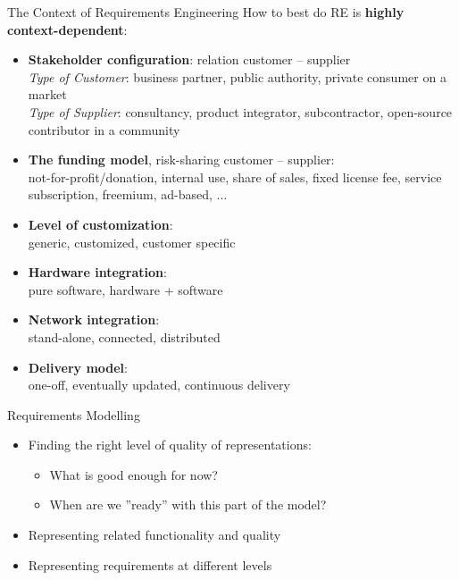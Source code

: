 \documentclass{beamer}
\begin{document}
\begin{frame}[fragile]{The Context of Requirements Engineering}
How to best do RE is \textbf{highly context-dependent}:
\begin{itemize} 
\item \textbf{Stakeholder configuration}: relation customer -- supplier
\\\textit{Type of Customer}: business partner, public authority, private consumer on a market
\\\textit{Type of Supplier}: consultancy, product integrator, subcontractor, open-source contributor in a community
\item \textbf{The funding model}, risk-sharing customer -- supplier:
\\not-for-profit/donation, internal use, share of sales, fixed license fee, service subscription, freemium, ad-based, ... 
\item \textbf{Level of customization}:
\\generic, customized, customer specific
\item \textbf{Hardware integration}:
\\pure software, hardware + software
\item \textbf{Network integration}:
\\stand-alone, connected, distributed
\item \textbf{Delivery model}:
\\one-off, eventually updated, continuous delivery
\end{itemize}
\end{frame}

\begin{frame}[fragile]{Requirements Modelling}
\begin{itemize}
\item Finding the right level of quality of representations:
\begin{itemize}
\item What is good enough for now?
\item When are we ''ready'' with this part of the model?
\end{itemize}
\item Representing related functionality and quality
\item Representing requirements at different levels
\end{itemize}
\end{frame}
\end{document}
